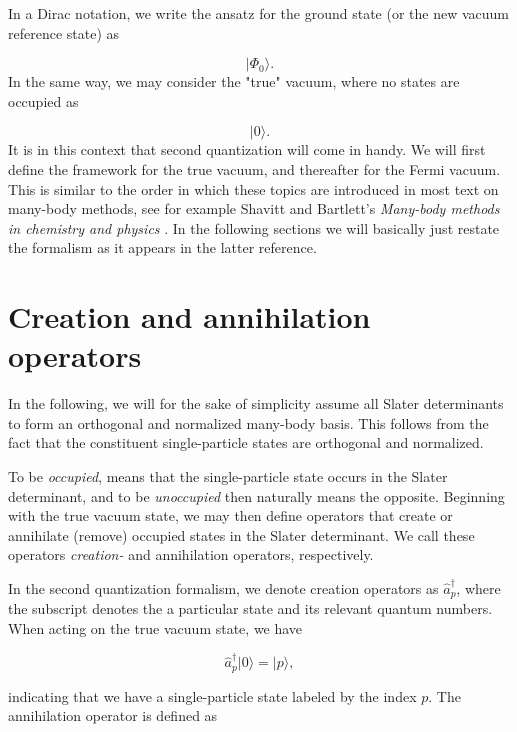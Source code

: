 In a Dirac notation, we write the ansatz for the ground state (or the new vacuum reference state) as \cite{ShavittBartlett2009}

\begin{equation}
 \vert \Phi_0 \rangle.
\label{eqn:fermivacuum}
\end{equation}
In the same way, we may consider the "true" vacuum, where no states are occupied as

\begin{equation}
 \vert 0 \rangle.
\label{eqn:truevacuum}
\end{equation}
It is in this context that second quantization will come in handy. We
will first define the framework for the true vacuum, and thereafter
for the Fermi vacuum. This is similar to the order in which these
topics are introduced in most text on many-body methods, see for example Shavitt and Bartlett's \emph{Many-body methods in chemistry and physics}
\cite{ShavittBartlett2009}. In the following sections we will
basically just restate the formalism as it appears in the latter reference.

\section{Creation and annihilation operators}

In the following, we will for the sake of simplicity assume all Slater determinants to form an orthogonal and normalized many-body basis. This follows from the fact that the constituent single-particle states are orthogonal and normalized. 

To be \emph{occupied}, means that the single-particle state occurs in the Slater determinant, and to be \emph{unoccupied} then naturally means the opposite. Beginning with the true vacuum state, we may then define operators that create or annihilate (remove) occupied states in the Slater determinant. We call these operators \emph{creation-} and {annihilation} operators, respectively. 

In the second quantization formalism, we denote creation operators as $\hat{a}_p^{\dagger}$,  where the subscript denotes the a particular state and its relevant quantum numbers. When acting on the true vacuum state, we have

\begin{equation}
\hat{a}_p^\dagger \vert 0 \rangle = \vert p \rangle,
\label{eqn:creation}
\end{equation}

indicating that we have a single-particle state labeled by the index $p$. The annihilation operator is defined as 

